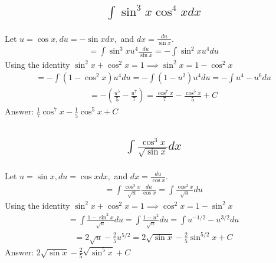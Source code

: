 \documentclass{article}
\begin{document}
\subsection{
	\begin{align*}
		\int{\sin^3{x} \cos^4{x} dx}
	\end{align*}
}
Let $u = \cos{x}, du = -\sin{x} dx,$ and $dx = \frac{du}{\sin{x}}$.
\begin{align*}
	= \int{\sin^3{x} u^4 \frac{du}{\sin{x}}} = -\int{\sin^2{x} u^4 du}
\end{align*}
Using the identity $\sin^2{x} + \cos^2{x} = 1 \implies \sin^2{x} = 1 - \cos^2{x}$
\begin{align*}
	= -\int{(1 - \cos^2{x}) u^4 du} = -\int{(1 - u^2)u^4 du} = -\int{u^4 - u^6 du}
\end{align*}
\begin{align*}
	= -\left( \frac{u^5}{5} - \frac{u^7}{7} \right) = \frac{\cos^7{x}}{7} - \frac{\cos^5{x}}{5} + C
\end{align*}
Answer: $\frac{1}{7}\cos^7{x} - \frac{1}{5} \cos^5{x} + C$

\subsection{
	\begin{align*}
		\int{\frac{\cos^3{x}}{\sqrt{\sin{x}}} dx}
	\end{align*}
}
Let $u = \sin{x}, du = \cos{x}dx,$ and $dx = \frac{du}{\cos{x}}$. 
\begin{align*}
	= \int{\frac{\cos^3{x}}{\sqrt{u}}\frac{du}{\cos{x}}} = \int{\frac{\cos^2{x}}{\sqrt{u}}du}
\end{align*}
Using the identity $\sin^2{x} + \cos^2{x} = 1 \implies \cos^2{x} = 1 - \sin^2{x}$
\begin{align*}
	= \int{\frac{1 - \sin^2{x}}{\sqrt{u}}du} = \int{\frac{1 - u^2}{\sqrt{u}} du} = \int{u^{-1/2} - u^{3/2} du}
\end{align*}
\begin{align*}
	= 2\sqrt{u} - \frac{2}{5}u^{5/2} = 2 \sqrt{\sin{x}} - \frac{2}{5} \sin^{5/2}{x} + C
\end{align*}
Answer: $2 \sqrt{\sin{x}} - \frac{2}{5} \sqrt{\sin^5{x}} + C$

\end{document}
